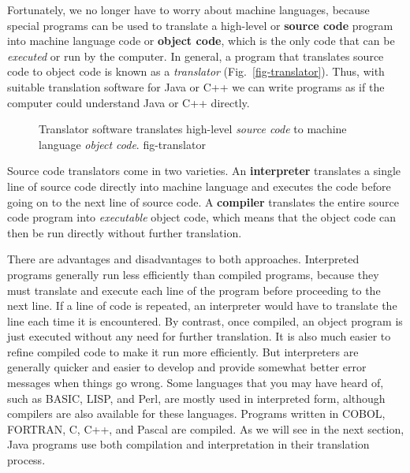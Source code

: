 Fortunately, we no longer have to worry about machine languages,
because special programs can be used to translate a high-level or {\bf
source code} program into machine language code or
{\bf object code}, which is the only code that can
be {\em executed} or run by the computer.  In general, a program that translates
source code to object code is known as a {\it
translator} (Fig.~\ref{fig-translator}).  Thus, with
suitable translation software for Java or C++ we can write programs as
if the computer could understand Java or C++ directly.

\begin{figure}[tb]
{Translator software translates high-level
{\it source code} to machine language {\it object code}.
} {fig-translator}

\end{figure}

Source code translators come in two varieties.  An {\bf
interpreter} translates a single line of source
code directly into machine language and executes the code before going
on to the next line of source code.  A {\bf compiler}
translates the entire source code program into {\em executable} object
code, which means that the object code can then be run directly
without further translation.

There are advantages and disadvantages to both approaches.
Interpreted programs generally run less efficiently than compiled
programs, because they must translate and execute each line of the
program before proceeding to the next line. If a line of code is
repeated, an interpreter would have to translate the line each time it
is encountered. By contrast, once compiled, an object program is just
executed without any need for further translation.  It is also much
easier to refine compiled code to make it run more efficiently.  But
interpreters are generally quicker and easier to develop and provide
somewhat better error messages when things go wrong.  Some languages
that you may have heard of, such as BASIC, LISP, and Perl, are mostly
used in interpreted form, although compilers are also available for
these languages.  Programs written in COBOL, FORTRAN, C, C++, and
Pascal are compiled.  As we will see in the next section, Java
programs use both compilation and interpretation in their translation
process.

